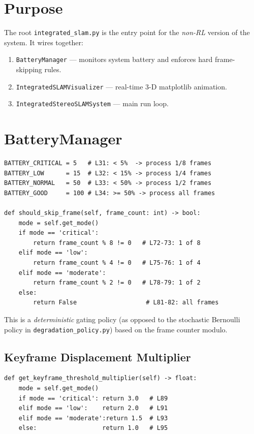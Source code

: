 \documentclass[12pt,a4paper,twoside]{report}
\theoremstyle{definition}
\newcommand{\code}[1]{\texttt{#1}}
\newcommand{\file}[1]{\texttt{\textcolor{codeblue}{#1}}}
\begin{document}
\section{Purpose}

The root \file{integrated\_slam.py} is the entry point for the \emph{non-RL}
version of the system. It wires together:
\begin{enumerate}
  \item \code{BatteryManager} --- monitors system battery and enforces hard frame-skipping rules.
  \item \code{IntegratedSLAMVisualizer} --- real-time 3-D matplotlib animation.
  \item \code{IntegratedStereoSLAMSystem} --- main run loop.
\end{enumerate}

\section{BatteryManager}

\begin{lstlisting}
BATTERY_CRITICAL = 5   # L31: < 5%  -> process 1/8 frames
BATTERY_LOW      = 15  # L32: < 15% -> process 1/4 frames
BATTERY_NORMAL   = 50  # L33: < 50% -> process 1/2 frames
BATTERY_GOOD     = 100 # L34: >= 50% -> process all frames

def should_skip_frame(self, frame_count: int) -> bool:
    mode = self.get_mode()
    if mode == 'critical':
        return frame_count % 8 != 0   # L72-73: 1 of 8
    elif mode == 'low':
        return frame_count % 4 != 0   # L75-76: 1 of 4
    elif mode == 'moderate':
        return frame_count % 2 != 0   # L78-79: 1 of 2
    else:
        return False                   # L81-82: all frames
\end{lstlisting}

This is a \emph{deterministic} gating policy (as opposed to the stochastic
Bernoulli policy in \code{degradation\_policy.py}) based on the frame counter
modulo.

\subsection{Keyframe Displacement Multiplier}

\begin{lstlisting}
def get_keyframe_threshold_multiplier(self) -> float:
    mode = self.get_mode()
    if mode == 'critical': return 3.0   # L89
    elif mode == 'low':    return 2.0   # L91
    elif mode == 'moderate':return 1.5  # L93
    else:                  return 1.0   # L95
\end{lstlisting}
\end{document}
